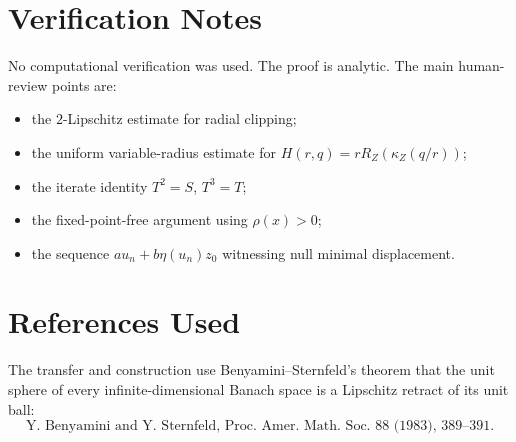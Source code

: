 \documentclass[11pt]{article}
\begin{document}
\section*{Verification Notes}

No computational verification was used.  The proof is analytic.  The main
human-review points are:
\begin{itemize}
\item the \(2\)-Lipschitz estimate for radial clipping;
\item the uniform variable-radius estimate for
  \(H(r,q)=rR_Z(\kappa_Z(q/r))\);
\item the iterate identity \(T^2=S\), \(T^3=T\);
\item the fixed-point-free argument using \(\rho(x)>0\);
\item the sequence \(a u_n+b\eta(u_n)z_0\) witnessing null minimal
  displacement.
\end{itemize}

\section*{References Used}

The transfer and construction use Benyamini--Sternfeld's theorem that the
unit sphere of every infinite-dimensional Banach space is a Lipschitz retract
of its unit ball:
\[
\text{Y. Benyamini and Y. Sternfeld, Proc. Amer. Math. Soc. 88 (1983),
389--391.}
\]
\end{document}
